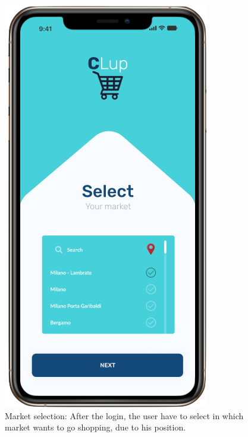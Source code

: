 \begin{figure}[H]
  \caption{Market selection: After the login, the user have to select in which market wants to go shopping, due to his position.}
  \label{fig:Login}
  \centering
 \includegraphics[scale=0.35]{images/mockup/select2.png}

\end{figure}







